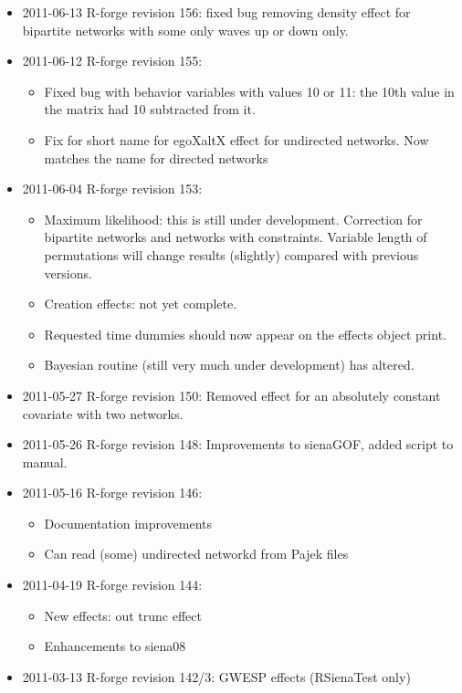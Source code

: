 \documentclass[a4paper,fleqn,11pt]{article}
\newcommand{\+}{\, + \,}
\begin{document}
{\begin{small}
\begin{itemize}
  controlling maximum size of move was incorrect if using prevAns for an exactly
  equivalent fit.
\item 2011-06-13 R-forge revision 156: fixed bug removing density effect for
  bipartite networks with some only waves up or down only.
\item 2011-06-12 R-forge revision 155:
\begin{itemize}
\item Fixed bug with behavior variables with values 10 or 11: the 10th value in
  the matrix had 10 subtracted from it.
\item Fix for short name for egoXaltX effect for undirected networks. Now
  matches the name for directed networks
\end{itemize}
\item 2011-06-04 R-forge revision 153:
\begin{itemize}
\item Maximum likelihood: this is still under development. Correction for
  bipartite networks and networks with constraints. Variable length of
  permutations will change results (slightly) compared with previous versions.
\item Creation effects: not yet complete.
\item Requested time dummies should now appear on the effects object print.
\item Bayesian routine (still very much under development) has altered.
\end{itemize}
\item 2011-05-27 R-forge revision 150: Removed effect for an absolutely constant
  covariate with two networks.
\item 2011-05-26 R-forge revision 148:
Improvements to sienaGOF, added script to manual.
\item 2011-05-16 R-forge revision 146:
\begin{itemize}
\item Documentation improvements
\item Can read (some) undirected networkd from Pajek files
\end{itemize}
\item 2011-04-19 R-forge revision 144:
\begin{itemize}
\item New effects: out trunc effect
\item Enhancements to siena08
\end{itemize}
\item 2011-03-13 R-forge revision 142/3: GWESP effects (RSienaTest only)

\end{itemize}
\end{small}}
\end{document}

